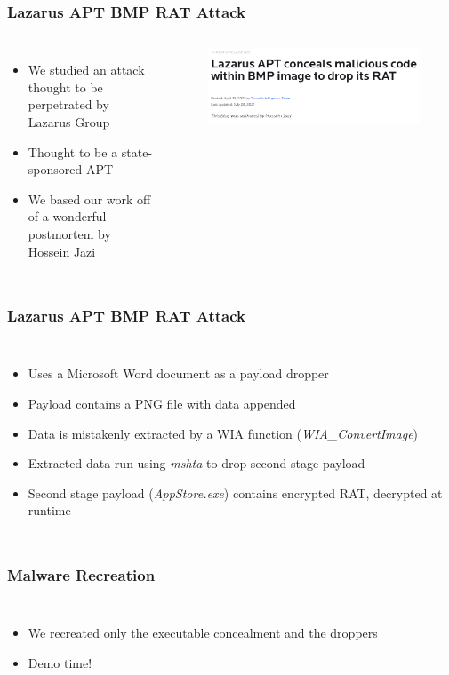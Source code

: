 \documentclass[fleqn]{beamer}
\begin{document}
\begin{frame}
  \frametitle{Lazarus APT BMP RAT Attack}
  \begin{columns}[T]
    \column{\textwidth}
    \begin{itemize}
      \item We studied an attack thought to be perpetrated by Lazarus Group
      \item Thought to be a state-sponsored APT
      \item We based our work off of a wonderful postmortem by Hossein Jazi
    \end{itemize}
    \begin{figure}[H]
      \centering
      \includegraphics[scale=0.5]{images/rat_blog.png}
    \end{figure}
  \end{columns}
\end{frame}

\begin{frame}
  \frametitle{Lazarus APT BMP RAT Attack}
  \begin{columns}[T]
    \column{\textwidth}
    \begin{itemize}
      \item Uses a Microsoft Word document as a payload dropper
      \item Payload contains a PNG file with data appended
      \item Data is mistakenly extracted by a WIA function (\emph{WIA\_ConvertImage})
      \item Extracted data run using \emph{mshta} to drop second stage payload
      \item Second stage payload (\emph{AppStore.exe}) contains encrypted RAT, decrypted at runtime
    \end{itemize}
  \end{columns}
\end{frame}

\begin{frame}
  \frametitle{Malware Recreation}
  \begin{columns}[T]
    \column{\textwidth}
    \begin{itemize}
      \item We recreated only the executable concealment and the droppers
      \item Demo time!
    \end{itemize}
  \end{columns}
\end{frame}
\end{document}
